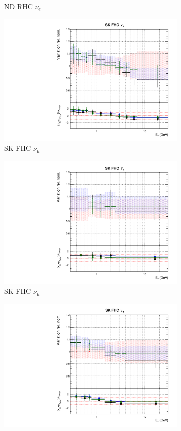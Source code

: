 \begin{figure}
\begin{subfigure}{0.24\textwidth}
  \caption{ND RHC $\bar{\nu_e}$}
\end{subfigure}
\begin{subfigure}{0.24\textwidth}
  \centering
  \includegraphics[width=0.95\linewidth]{figs/fgdfitsflux_8}
  \caption{SK FHC $\nu_{\mu}$}
\end{subfigure}
\begin{subfigure}{0.24\textwidth}
  \centering
  \includegraphics[width=0.95\linewidth]{figs/fgdfitsflux_9}
  \caption{SK FHC $\bar{\nu_{\mu}}$}
\end{subfigure}
\begin{subfigure}{0.24\textwidth}
  \centering
  \includegraphics[width=0.95\linewidth]{figs/fgdfitsflux_10}

\end{subfigure}
\end{figure}
